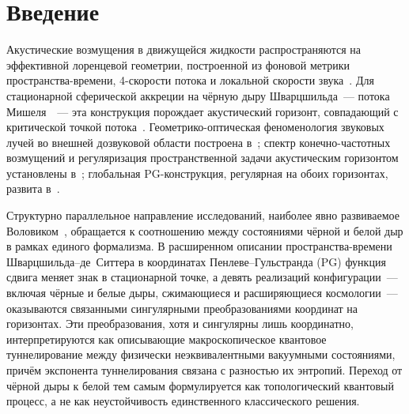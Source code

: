 \documentclass[12pt,a4paper,preprint]{elsarticle}
\begin{document}
    \section{Введение}\label{sec:introduction}
        Акустические возмущения в движущейся жидкости распространяются на эффективной лоренцевой геометрии, построенной из фоновой метрики пространства-времени, 4-скорости потока и локальной скорости звука~\cite{UnruhWG_ExperimentalBlackHoleEvaporation_1981, VisserM_AcousticBlackHolesHorizonsErgospheresAndHawkingRadiation_1998, BarceloC_LiberatiS_VisserM_AnalogueGravity_2011}. Для стационарной сферической аккреции на чёрную дыру Шварцшильда~--- потока Мишеля~\cite{MichelFC_AccretionOfMatterByCondensedObjects_1972}~--- эта конструкция порождает акустический горизонт, совпадающий с критической точкой потока~\cite{SemyannikovAV_AcousticGeometryAndSoundRayDynamicsInRelativisticSphericalAccretion_2026}. Геометрико-оптическая феноменология звуковых лучей во внешней дозвуковой области построена в~\cite{SemyannikovAV_AcousticGeometryAndSoundRayDynamicsInRelativisticSphericalAccretion_2026}; спектр конечно-частотных возмущений и регуляризация пространственной задачи акустическим горизонтом установлены в~\cite{SemyannikovAV_PerturbationSpectrumOfMichelFlowAcousticVorticalAndEntropyModes_2026}; глобальная PG-конструкция, регулярная на обоих горизонтах, развита в~\cite{SemyannikovAV_GlobalAcousticGeometryOfMichelFlowInPainleveGullstrandCoordinates_2026}.
        
        Структурно параллельное направление исследований, наиболее явно развиваемое Воловиком~\cite{VolovikGE_PainleveGullstrandCoordinatesForSchwarzschildDeSitterSpacetime_2023}, обращается к соотношению между состояниями чёрной и белой дыр в рамках единого формализма. В расширенном описании пространства-времени Шварцшильда--де~Ситтера в координатах Пенлеве--Гульстранда (PG) функция сдвига меняет знак в стационарной точке, а девять реализаций конфигурации~--- включая чёрные и белые дыры, сжимающиеся и расширяющиеся космологии~--- оказываются связанными сингулярными преобразованиями координат на горизонтах. Эти преобразования, хотя и сингулярны лишь координатно, интерпретируются как описывающие макроскопическое квантовое туннелирование между физически неэквивалентными вакуумными состояниями, причём экспонента туннелирования связана с разностью их энтропий. Переход от чёрной дыры к белой тем самым формулируется как топологический квантовый процесс, а не как неустойчивость единственного классического решения.
        
\end{document}
